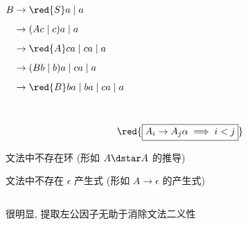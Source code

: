 \begin{frame}{}
  \begin{columns}
	  
	  \pause
		\begin{align*}
			B &\to \red{S}a \mid a \\[5pt]
			  &\to (Ac \mid c) a \mid a \\[5pt]
			&\to \red{A}ca \mid ca \mid a \\[5pt]
			&\to (Bb \mid b) a \mid ca \mid a \\[5pt]
			&\to \red{B}ba \mid ba \mid ca \mid a \\[5pt]
		\end{align*}
  \end{columns}

  \pause
  \vspace{-0.50cm}
  

  \pause
  \[
    \red{\boxed{A_{i} \to A_{j} \alpha \implies i < j}}
  \]
\end{frame}

\begin{frame}{}
  \begin{center}

    \vspace{0.50cm}
    文法中不存在环 (形如 $A \dstar A$ 的推导)

    \vspace{0.50cm}
	文法中不存在 $\epsilon$ 产生式 (形如 $A \to \epsilon$ 的产生式)
  \end{center}

  \pause
  
\end{frame}

\begin{frame}{}
  \begin{center}

    \vspace{0.30cm}

  \end{center}
\end{frame}

\begin{frame}{}
  \begin{center}
    \begin{columns}
    \end{columns}

    \vspace{1.00cm}
    很明显, 提取左公因子无助于消除文法二义性
  \end{center}
\end{frame}
